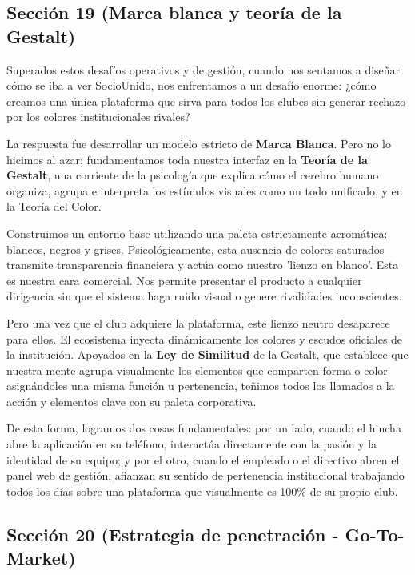 \subsection{Sección 19 (Marca blanca y teoría de la Gestalt)}

Superados estos desafíos operativos y de gestión, cuando nos sentamos a diseñar cómo se iba a ver SocioUnido, nos enfrentamos a un desafío enorme: ¿cómo creamos una única plataforma que sirva para todos los clubes sin generar rechazo por los colores institucionales rivales?

La respuesta fue desarrollar un modelo estricto de \textbf{Marca Blanca}. Pero no lo hicimos al azar; fundamentamos toda nuestra interfaz en la \textbf{Teoría de la Gestalt}, una corriente de la psicología que explica cómo el cerebro humano organiza, agrupa e interpreta los estímulos visuales como un todo unificado, y en la Teoría del Color.

Construimos un entorno base utilizando una paleta estrictamente acromática: blancos, negros y grises. Psicológicamente, esta ausencia de colores saturados transmite transparencia financiera y actúa como nuestro 'lienzo en blanco'. Esta es nuestra cara comercial. Nos permite presentar el producto a cualquier dirigencia sin que el sistema haga ruido visual o genere rivalidades inconscientes.

Pero una vez que el club adquiere la plataforma, este lienzo neutro desaparece para ellos. El ecosistema inyecta dinámicamente los colores y escudos oficiales de la institución. Apoyados en la \textbf{Ley de Similitud} de la Gestalt, que establece que nuestra mente agrupa visualmente los elementos que comparten forma o color asignándoles una misma función u pertenencia, teñimos todos los llamados a la acción y elementos clave con su paleta corporativa.

De esta forma, logramos dos cosas fundamentales: por un lado, cuando el hincha abre la aplicación en su teléfono, interactúa directamente con la pasión y la identidad de su equipo; y por el otro, cuando el empleado o el directivo abren el panel web de gestión, afianzan su sentido de pertenencia institucional trabajando todos los días sobre una plataforma que visualmente es 100\% de su propio club.

\subsection{Sección 20 (Estrategia de penetración - Go-To-Market)}

